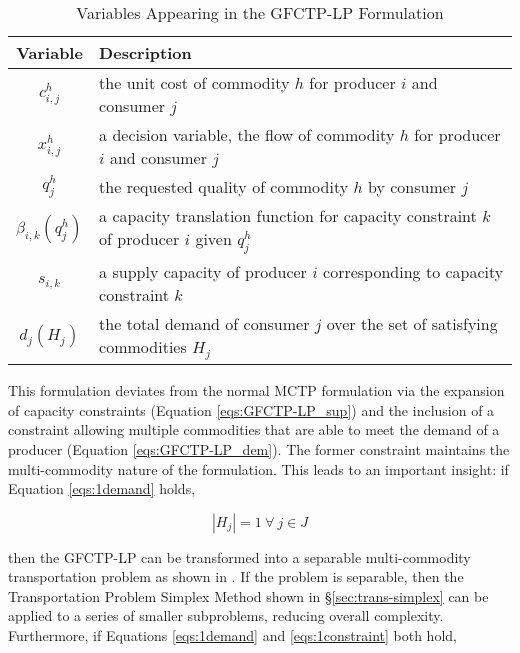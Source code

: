 \begin{table} [h!]
\centering
\begin{tabularx}{\textwidth-20pt}{|c|X|} %
\hline
Variable    & Description \\
\hline
$c_{i,j}^{h}$             & the unit cost of commodity $h$ 
                         for producer $i$ and consumer $j$  \\
$x_{i,j}^{h}$             & a decision variable, the flow of commodity $h$ 
                         for producer $i$ and consumer $j$  \\
$q_{j}^{h}$               & the requested quality of commodity $h$ 
                         by consumer $j$  \\
$\beta_{i,k}(q_{j}^{h})$  & a capacity translation function for capacity 
                         constraint $k$ of producer $i$ given $q_{j}^{h}$ \\
$s_{i,k}$                & a supply capacity of producer $i$ corresponding to 
                         capacity constraint $k$ \\
$d_{j}(H_{j})$           & the total demand of consumer $j$ over the set of 
                         satisfying commodities $H_{j}$ \\
\hline
\end{tabularx}
\caption{Variables Appearing in the GFCTP-LP Formulation}
\label{tbl:GFCTP-LP-vars}
\end{table}

This formulation deviates from the normal MCTP formulation via the expansion of
capacity constraints (Equation \ref{eqs:GFCTP-LP_sup}) and the inclusion of a
constraint allowing multiple commodities that are able to meet the demand of a
producer (Equation \ref{eqs:GFCTP-LP_dem}). The former constraint maintains the
multi-commodity nature of the formulation. This leads to an important insight: if
Equation \ref{eqs:1demand} holds,

\begin{equation}\label{eqs:1demand}
  \left|{H_{j}}\right| = 1 \: \forall \: j \in J
\end{equation}

then the GFCTP-LP can be transformed into a separable multi-commodity
transportation problem as shown in \cite{bertsekas_network_1998}. If the problem
is separable, then the Transportation Problem Simplex Method shown in
\S\ref{sec:trans-simplex} can be applied to a series of smaller subproblems,
reducing overall complexity. Furthermore, if Equations \ref{eqs:1demand} and
\ref{eqs:1constraint} both hold,

